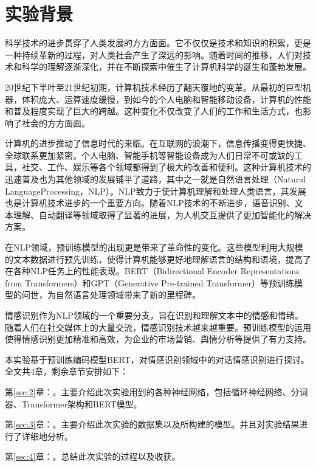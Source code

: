 \section{实验背景}

科学技术的进步贯穿了人类发展的方方面面。它不仅仅是技术和知识的积累，更是一种持续革新的过程，对人类社会产生了深远的影响。随着时间的推移，人们对技术和科学的理解逐渐深化，并在不断探索中催生了计算机科学的诞生和蓬勃发展。

20世纪下半叶至21世纪初期，计算机技术经历了翻天覆地的变革。从最初的巨型机器，体积庞大、运算速度缓慢，到如今的个人电脑和智能移动设备，计算机的性能和普及程度实现了巨大的跨越。这种变化不仅改变了人们的工作和生活方式，也影响了社会的方方面面。

计算机的进步推动了信息时代的来临。在互联网的浪潮下，信息传播变得更快捷、全球联系更加紧密。个人电脑、智能手机等智能设备成为人们日常不可或缺的工具，社交、工作、娱乐等各个领域都得到了极大的改善和便利。这种计算机技术的迅速普及也为其他领域的发展铺平了道路，其中之一就是自然语言处理（Natural LanguageProcessing，NLP）。NLP致力于使计算机理解和处理人类语言，其发展也是计算机技术进步的一个重要方向。随着NLP技术的不断进步，语音识别、文本理解、自动翻译等领域取得了显著的进展，为人机交互提供了更加智能化的解决方案。

在NLP领域，预训练模型的出现更是带来了革命性的变化。这些模型利用大规模的文本数据进行预先训练，使得计算机能够更好地理解语言的结构和语境，提高了在各种NLP任务上的性能表现。BERT（Bidirectional Encoder Representations from Transformers）\cite{BERT}和GPT（Generative Pre-trained Transformer）\cite{GPT}等预训练模型的问世，为自然语言处理领域带来了新的里程碑。

情感识别作为NLP领域的一个重要分支，旨在识别和理解文本中的情感和情绪。随着人们在社交媒体上的大量交流，情感识别技术越来越重要。预训练模型的运用使得情感识别更加精准和高效，为企业的市场营销、舆情分析等提供了有力支持。

本实验基于预训练编码模型BERT，对情感识别领域中的对话情感识别进行探讨。全文共4章，剩余章节安排如下：

第\ref{sec:2}章：。主要介绍此次实验用到的各种神经网络，包括循环神经网络、分词器、Transformer架构\cite{transformer}和BERT模型。

第\ref{sec:3}章：。主要介绍此次实验的数据集以及所构建的模型。并且对实验结果进行了详细地分析。

第\ref{sec:4}章：。总结此次实验的过程以及收获。









